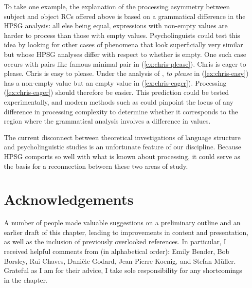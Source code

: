 \documentclass[output=paper
	        ,collection
	        ,collectionchapter
 	        ,biblatex
                ,babelshorthands
                ,newtxmath
                ,draftmode
                ,colorlinks, citecolor=brown
]{langscibook}
\begin{document}
To take one example, the explanation of the processing asymmetry between subject and object RCs
offered above is based on a grammatical difference in the HPSG analysis:  all else being equal,
expressions with non-empty \isi{\slasch} values are harder to process than those with empty \slasch
values.  Psycholinguists could test this idea by looking for other cases of phenomena that look
superficially very similar but whose HPSG analyses differ with respect to whether \slasch is empty.
One such case occurs with pairs like \addpages famous minimal pair in
(\ref{ex:chris-please}). 
\eal\label{ex:chris-please}
\ex Chris is eager to please.\label{ex:chris-eager}
\ex Chris is easy to please.\label{ex:chris-easy}
\zl
Under the analysis of \citet[Section~4.3]{ps2}, \emph{to please} in (\ref{ex:chris-easy}) has a non-empty
\isi{\slasch} value but an empty \slasch value in (\ref{ex:chris-eager}).  Processing
(\ref{ex:chris-eager}) should therefore be easier.  This prediction could be tested experimentally,
and modern methods such as  could pinpoint the locus of any difference in
processing complexity to determine whether it corresponds to the region where the grammatical
analysis involves a difference in \isi{\slasch} values. 

The current disconnect between theoretical investigations of language structure and psycholinguistic
studies is an unfortunate feature of our discipline.  Because HPSG comports so well with what is
known about processing, it could serve as the basis for a reconnection between these two areas of
study. 

\section*{Acknowledgements}

A number of people made valuable suggestions on a preliminary outline and an earlier draft of this
chapter, leading to improvements in content and presentation, as well as the inclusion of previously
overlooked references.  In particular, I received helpful comments from (in alphabetical order):
Emily Bender, Bob Borsley, Rui Chaves, Danièle Godard, Jean-Pierre Koenig, and Stefan Müller.
Grateful as I am for their advice, I take sole responsibility for any shortcomings in the chapter. 

{\sloppy
\printbibliography[heading=subbibliography,notkeyword=this] 
}
\end{document}
